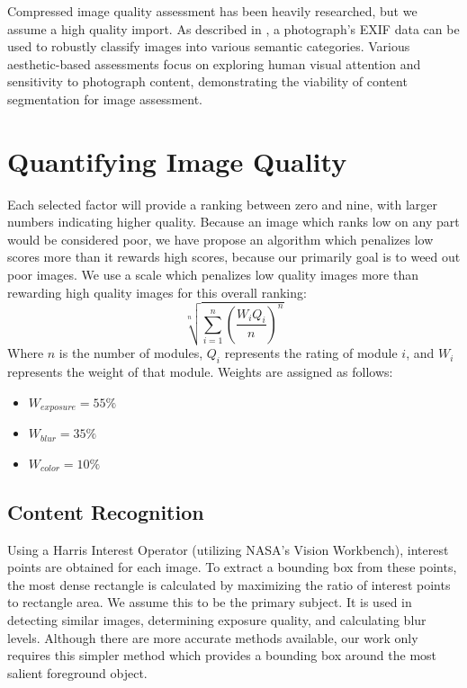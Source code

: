 \documentclass[10pt,twocolumn,letterpaper]{article}
\begin{document}
Compressed image quality assessment has been heavily researched\cite{477498}\cite{1038064}\cite{1284395}, but we assume a high quality import. As described in \cite{1315222}, a photograph's EXIF data can be used to robustly classify images into various semantic categories. Various aesthetic-based assessments focus on exploring human visual attention and sensitivity to photograph content\cite{Sun:2009:PAB:1631272.1631351}\cite{1518955}\cite{Pimenov_fastimage}, demonstrating the viability of content segmentation for image assessment.

\section{Quantifying Image Quality}
Each selected factor will provide a ranking between zero and nine, with larger numbers indicating higher quality. Because an image which ranks low on any part would be considered poor, we have propose an algorithm which penalizes low scores more than it rewards high scores, because our primarily goal is to weed out poor images. We use a scale which penalizes low quality images more than rewarding high quality images for this overall ranking:
\[
\sqrt[n]{\displaystyle\sum\limits_{i=1}^n(\frac{W_iQ_i}{n})^n}
\]
Where \(n\) is the number of modules, \(Q_i\) represents the rating of module \(i\), and \(W_i\) represents the weight of that module. Weights are assigned as follows:
\begin{itemize}
\item \(W_{exposure}=55\%\)
\item \(W_{blur}=35\%\)
\item \(W_{color}=10\%\)
\end{itemize}

\subsection{Content Recognition}
Using a Harris Interest Operator (utilizing NASA's Vision Workbench\cite{vision-workbench}), interest points are obtained for each image. To extract a bounding box from these points, the most dense rectangle is calculated by maximizing the ratio of interest points to rectangle area. We assume this to be the primary subject. It is used in detecting similar images, determining exposure quality, and calculating blur levels. Although there are more accurate methods available\cite{5649226}, our work only requires this simpler method which provides a bounding box around the most salient foreground object.
\end{document}
